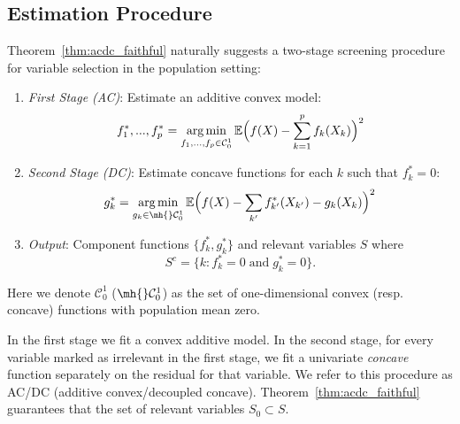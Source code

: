 \def\C{\mathcal{C}}

\subsection{Estimation Procedure}
\label{sec:acdc}

Theorem~\ref{thm:acdc_faithful} naturally suggests 
a two-stage screening procedure for variable selection in the population setting:

\begin{enumerate}
\item[] \textit{First Stage (AC)}:  Estimate an additive convex model:
\begin{equation}
\label{eqn:scam2_pop}
f^*_1, ..., f^*_p = \argmin_{f_1,...,f_p \in \C^1_0} 
   \E \Big( f(X)  - \sum_{k=1}^p f_k(X_k) \Big)^2 
\end{equation}
\item[] \textit{Second Stage (DC)}:  Estimate concave functions
 for each $k$ such that $ f^*_k = 0$:
\begin{equation}
\label{eqn:dc2}
g^*_k = \argmin_{g_k \in \mh{}\C^1_0} 
   \E \Big( f(X) - \sum_{k'} f^*_{k'}(X_{k'}) 
    - g_k(X_{k})\Big)^2 
\end{equation}
\item[] \textit{Output}: Component functions $\{f^*_k, g^*_k\}$ and 
relevant variables $S$ where
\begin{equation}
S^c = \bigl\{k : f^*_k =
0 \; \mathrm{and}\; g^*_k =0\bigr\}.
\end{equation}
\end{enumerate}
Here we denote $\C^1_0$ ($\mh{}\C^1_0$) as the set of one-dimensional convex (resp. concave) functions with population mean zero. 

In the first stage we fit a convex additive model.
In the second stage, for every variable marked as irrelevant in the first stage,
we fit a univariate \emph{concave} function separately on the residual for
that variable. We refer to this procedure as AC/DC (additive
convex/decoupled concave). Theorem~\ref{thm:acdc_faithful} guarantees that the set of relevant variables $S_0 \subset S$.

